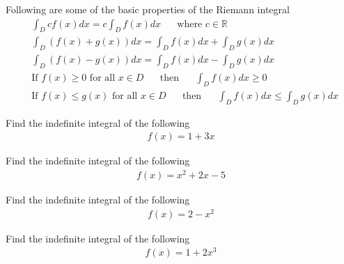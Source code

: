\begin{theorem}
Following are some of the basic properties of the Riemann integral
\begin{align*}
    &\int_{D} c f(x) dx = c \int_{D} f(x) dx \hspace{20pt} \text{where} \hspace{4pt} c \in \mathbb{R}\\[2ex]
    &\int_{D} (f(x) + g(x)) dx = \int_{D} f(x) dx + \int_{D} g(x) dx\\[2ex]
    &\int_{D} (f(x) - g(x)) dx = \int_{D} f(x) dx - \int_{D} g(x) dx\\[2ex]
    &\text{If} \hspace{4pt} f(x) \geq 0 \hspace{4pt} \text{for all $x \in D$} \hspace{20pt} \text{then} \hspace{20pt} \int_{D} f(x) dx \geq 0\\[2ex]
    &\text{If} \hspace{4pt} f(x) \leq g(x) \hspace{4pt} \text{for all $x \in D$} \hspace{20pt} \text{then} \hspace{20pt} \int_{D} f(x) dx \leq \int_{D} g(x) dx
\end{align*}
\end{theorem}

\begin{exercise}
Find the indefinite integral of the following
\begin{align*}
    f(x) = 1 + 3x
\end{align*}
\end{exercise}

\begin{exercise}
Find the indefinite integral of the following
\begin{align*}
    f(x) = x^{2} + 2x - 5
\end{align*}
\end{exercise}

\begin{exercise}
Find the indefinite integral of the following
\begin{align*}
    f(x) = 2 - x^{2}
\end{align*}
\end{exercise}

\begin{exercise}
Find the indefinite integral of the following
\begin{align*}
    f(x) = 1 + 2x^{3}
\end{align*}
\end{exercise}

